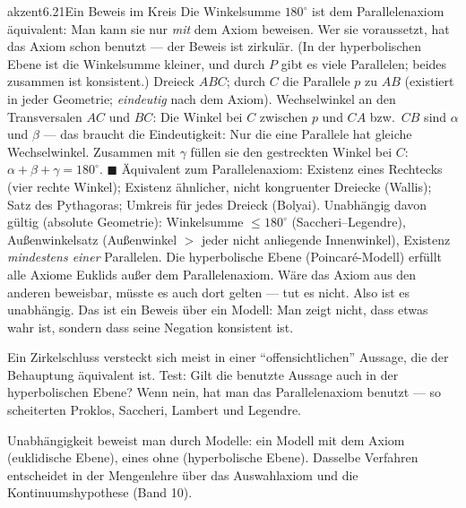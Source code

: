 \begin{loesungkarte}{akzent}{6.21}{Ein Beweis im Kreis}
Die Winkelsumme $180^{\circ}$ ist dem Parallelenaxiom äquivalent: Man kann sie nur \emph{mit} dem Axiom beweisen. Wer sie voraussetzt, hat das Axiom schon benutzt --- der Beweis ist zirkulär. (In der hyperbolischen Ebene ist die Winkelsumme kleiner, und durch $P$ gibt es viele Parallelen; beides zusammen ist konsistent.)
Dreieck $ABC$; durch $C$ die Parallele $p$ zu $AB$ (existiert in jeder Geometrie; \emph{eindeutig} nach dem Axiom). Wechselwinkel an den Transversalen $AC$ und $BC$: Die Winkel bei $C$ zwischen $p$ und $CA$ bzw.\ $CB$ sind $\alpha$ und $\beta$ --- das braucht die Eindeutigkeit: Nur die eine Parallele hat gleiche Wechselwinkel. Zusammen mit $\gamma$ füllen sie den gestreckten Winkel bei $C$: $\alpha + \beta + \gamma = 180^{\circ}$. $\blacksquare$
Äquivalent zum Parallelenaxiom: Existenz eines Rechtecks (vier rechte Winkel); Existenz ähnlicher, nicht kongruenter Dreiecke (Wallis); Satz des Pythagoras; Umkreis für jedes Dreieck (Bolyai). Unabhängig davon gültig (absolute Geometrie): Winkelsumme $\le180^{\circ}$ (Saccheri--Legendre), Außenwinkelsatz (Außenwinkel $>$ jeder nicht anliegende Innenwinkel), Existenz \emph{mindestens einer} Parallelen.
Die hyperbolische Ebene (Poincaré-Modell) erfüllt alle Axiome Euklids außer dem Parallelenaxiom. Wäre das Axiom aus den anderen beweisbar, müsste es auch dort gelten --- tut es nicht. Also ist es unabhängig. Das ist ein Beweis über ein Modell: Man zeigt nicht, dass etwas wahr ist, sondern dass seine Negation konsistent ist.
\begin{fehler}\kastentext
Ein Zirkelschluss versteckt sich meist in einer \enquote{offensichtlichen} Aussage, die der Behauptung äquivalent ist. Test: Gilt die benutzte Aussage auch in der hyperbolischen Ebene? Wenn nein, hat man das Parallelenaxiom benutzt --- so scheiterten Proklos, Saccheri, Lambert und Legendre.
\end{fehler}
\begin{mitnehmen}\kastentext
Unabhängigkeit beweist man durch Modelle: ein Modell mit dem Axiom (euklidische Ebene), eines ohne (hyperbolische Ebene). Dasselbe Verfahren entscheidet in der Mengenlehre über das Auswahlaxiom und die Kontinuumshypothese (Band 10).
\end{mitnehmen}
\end{loesungkarte}

